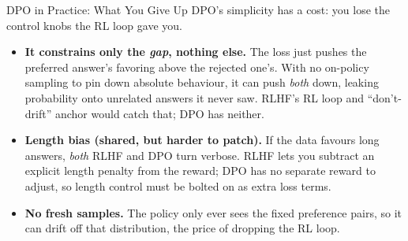 \begin{frame}{DPO in Practice: What You Give Up}
DPO's simplicity has a cost: you lose the control knobs the RL loop gave you.
\begin{itemize}\itemsep0.5em\small
    \item \textbf{It constrains only the \emph{gap}, nothing else.} The loss just
          pushes the preferred answer's favoring above the rejected one's. With no
          on-policy sampling to pin down absolute behaviour, it can push \emph{both}
          down, leaking probability onto unrelated answers it never saw. RLHF's
          RL loop and ``don't-drift'' anchor would catch that; DPO has neither.
    \item \textbf{Length bias (shared, but harder to patch).} If the data favours
          long answers, \emph{both} RLHF and DPO turn verbose. RLHF lets you subtract
          an explicit length penalty from the reward; DPO has no separate reward to
          adjust, so length control must be bolted on as extra loss terms.
    \item \textbf{No fresh samples.} The policy only ever sees the fixed preference
          pairs, so it can drift off that distribution, the price of dropping the
          RL loop.
\end{itemize}
\end{frame}


